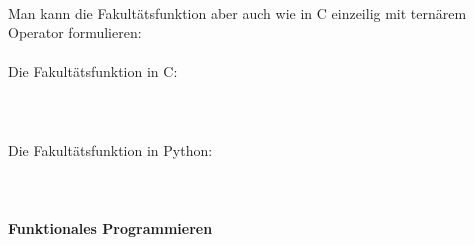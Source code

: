 \\
Man kann die Fakultätsfunktion aber auch wie in C einzeilig mit ternärem Operator formulieren:\\
\\
Die Fakultätsfunktion in C:\\
\\
\\
\\
Die Fakultätsfunktion in Python:\\
\\
\\

\paragraph{Funktionales Programmieren}\ \\

